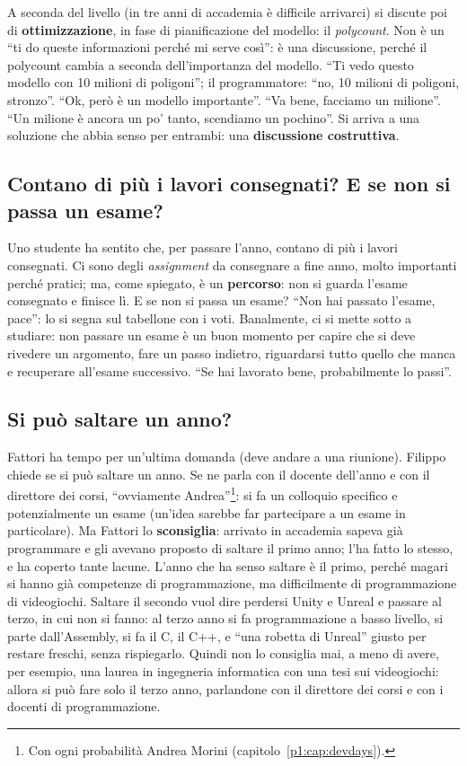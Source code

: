 A seconda del livello (in tre anni di accademia è difficile arrivarci) si discute poi
di \textbf{ottimizzazione}, in fase di pianificazione del
modello: il \emph{polycount}. Non è un ``ti do queste informazioni perché mi
serve così'': è una discussione, perché il polycount cambia a seconda
dell'importanza del modello. ``Ti vedo questo modello con 10 milioni di
poligoni''; il programmatore: ``no, 10 milioni di poligoni, stronzo''. ``Ok, però
è un modello importante''. ``Va bene, facciamo un milione''. ``Un milione è
ancora un po' tanto, scendiamo un pochino''. Si arriva a una soluzione che abbia
senso per entrambi: una \textbf{discussione costruttiva}.

\subsection{Contano di più i lavori consegnati? E se non si passa un esame?}

Uno studente ha sentito che, per passare l'anno, contano di più i lavori
consegnati. Ci sono degli \emph{assignment} da consegnare a fine anno, molto
importanti perché pratici; ma, come spiegato, è un \textbf{percorso}: non si
guarda l'esame consegnato e finisce lì. E se non si passa un esame? ``Non hai
passato l'esame, pace'': lo si segna sul tabellone con i voti. Banalmente, ci
si mette sotto a studiare: non passare un esame è un buon momento per capire
che si deve rivedere un argomento, fare un passo indietro, riguardarsi tutto
quello che manca e recuperare all'esame successivo. ``Se hai lavorato bene,
probabilmente lo passi''.

\subsection{Si può saltare un anno?}

Fattori ha tempo per un'ultima domanda (deve andare a una riunione). Filippo
chiede se si può saltare un anno. Se ne parla con il docente dell'anno e con
il direttore dei corsi, ``ovviamente Andrea''\footnote{Con ogni probabilità
Andrea Morini (capitolo~\ref{p1:cap:devdays}).}: si fa un colloquio specifico
e potenzialmente un esame (un'idea sarebbe far partecipare a un esame in
particolare). Ma Fattori lo \textbf{sconsiglia}: arrivato in accademia sapeva
già programmare e gli avevano proposto di saltare il primo anno; l'ha fatto lo
stesso, e ha coperto tante lacune. L'anno che ha senso saltare è il primo,
perché magari si hanno già competenze di programmazione, ma difficilmente di
programmazione di videogiochi. Saltare il secondo vuol dire perdersi Unity e
Unreal e passare al terzo, in cui non si fanno: al terzo anno si fa
programmazione a basso livello, si parte dall'Assembly, si fa il C, il C++, e
``una robetta di Unreal'' giusto per restare freschi, senza rispiegarlo. Quindi
non lo consiglia mai, a meno di avere, per esempio, una laurea in ingegneria
informatica con una tesi sui videogiochi: allora si può fare solo il terzo
anno, parlandone con il direttore dei corsi e con i docenti di programmazione.

